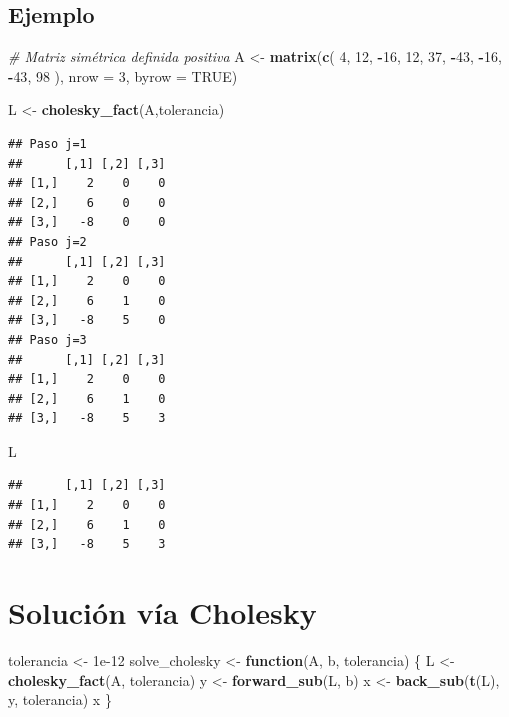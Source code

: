 \documentclass[
]{book}
\newenvironment{Shaded}{\begin{snugshade}}{\end{snugshade}}
\newcommand{\AttributeTok}[1]{\textcolor[rgb]{0.13,0.29,0.53}{#1}}
\newcommand{\CommentTok}[1]{\textcolor[rgb]{0.56,0.35,0.01}{\textit{#1}}}
\newcommand{\ConstantTok}[1]{\textcolor[rgb]{0.56,0.35,0.01}{#1}}
\newcommand{\ControlFlowTok}[1]{\textcolor[rgb]{0.13,0.29,0.53}{\textbf{#1}}}
\newcommand{\DecValTok}[1]{\textcolor[rgb]{0.00,0.00,0.81}{#1}}
\newcommand{\FloatTok}[1]{\textcolor[rgb]{0.00,0.00,0.81}{#1}}
\newcommand{\FunctionTok}[1]{\textcolor[rgb]{0.13,0.29,0.53}{\textbf{#1}}}
\newcommand{\NormalTok}[1]{#1}
\newcommand{\OtherTok}[1]{\textcolor[rgb]{0.56,0.35,0.01}{#1}}
\newcommand{\SpecialCharTok}[1]{\textcolor[rgb]{0.81,0.36,0.00}{\textbf{#1}}}
\begin{document}
\subsection{Ejemplo}\label{ejemplo-7}

\begin{Shaded}
\begin{Highlighting}[]
\CommentTok{\# Matriz simétrica definida positiva}
\NormalTok{A }\OtherTok{\textless{}{-}} \FunctionTok{matrix}\NormalTok{(}\FunctionTok{c}\NormalTok{(}
  \DecValTok{4}\NormalTok{,  }\DecValTok{12}\NormalTok{, }\SpecialCharTok{{-}}\DecValTok{16}\NormalTok{,}
 \DecValTok{12}\NormalTok{,  }\DecValTok{37}\NormalTok{, }\SpecialCharTok{{-}}\DecValTok{43}\NormalTok{,}
\SpecialCharTok{{-}}\DecValTok{16}\NormalTok{, }\SpecialCharTok{{-}}\DecValTok{43}\NormalTok{,  }\DecValTok{98}
\NormalTok{), }\AttributeTok{nrow =} \DecValTok{3}\NormalTok{, }\AttributeTok{byrow =} \ConstantTok{TRUE}\NormalTok{)}

\NormalTok{L }\OtherTok{\textless{}{-}} \FunctionTok{cholesky\_fact}\NormalTok{(A,tolerancia)}
\end{Highlighting}
\end{Shaded}

\begin{verbatim}
## Paso j=1
##      [,1] [,2] [,3]
## [1,]    2    0    0
## [2,]    6    0    0
## [3,]   -8    0    0
## Paso j=2
##      [,1] [,2] [,3]
## [1,]    2    0    0
## [2,]    6    1    0
## [3,]   -8    5    0
## Paso j=3
##      [,1] [,2] [,3]
## [1,]    2    0    0
## [2,]    6    1    0
## [3,]   -8    5    3
\end{verbatim}

\begin{Shaded}
\begin{Highlighting}[]
\NormalTok{L}
\end{Highlighting}
\end{Shaded}

\begin{verbatim}
##      [,1] [,2] [,3]
## [1,]    2    0    0
## [2,]    6    1    0
## [3,]   -8    5    3
\end{verbatim}

\section{Solución vía Cholesky}\label{soluciuxf3n-vuxeda-cholesky}

\begin{Shaded}
\begin{Highlighting}[]
\NormalTok{tolerancia }\OtherTok{\textless{}{-}} \FloatTok{1e{-}12}
\NormalTok{solve\_cholesky }\OtherTok{\textless{}{-}} \ControlFlowTok{function}\NormalTok{(A, b, tolerancia) \{}
\NormalTok{  L }\OtherTok{\textless{}{-}} \FunctionTok{cholesky\_fact}\NormalTok{(A, tolerancia)}
\NormalTok{  y }\OtherTok{\textless{}{-}} \FunctionTok{forward\_sub}\NormalTok{(L, b)}
\NormalTok{  x }\OtherTok{\textless{}{-}} \FunctionTok{back\_sub}\NormalTok{(}\FunctionTok{t}\NormalTok{(L), y, tolerancia)}
\NormalTok{  x}
\NormalTok{\}}
\end{Highlighting}
\end{Shaded}
\end{document}
